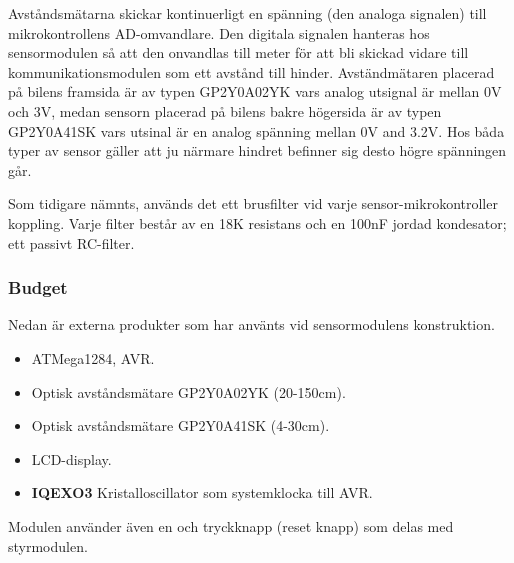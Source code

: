\documentclass[tekniskrapport/tech.tex]{subfiles}
\begin{document}
Avståndsmätarna skickar kontinuerligt en spänning (den analoga signalen) till mikrokontrollens AD-omvandlare. Den digitala signalen hanteras hos sensormodulen så att den onvandlas till meter för att bli skickad vidare till kommunikationsmodulen som ett avstånd till hinder. Avständmätaren placerad på bilens framsida är av typen GP2Y0A02YK vars analog utsignal är mellan 0V och 3V, medan sensorn placerad på bilens bakre högersida är av typen GP2Y0A41SK vars utsinal är en analog spänning mellan 0V and 3.2V. Hos båda typer av sensor gäller att ju närmare hindret befinner sig desto högre spänningen går. 

Som tidigare nämnts, används det ett brusfilter vid varje sensor-mikrokontroller koppling. Varje filter består av en 18K resistans och en 100nF jordad kondesator; ett passivt RC-filter.

\subsubsection{Budget}
Nedan är externa produkter som har använts vid sensormodulens konstruktion.
\begin{itemize}
	\item \textbf{\modMicrocontroller} ATMega1284, AVR. 
    \item \textbf{\modDistf} Optisk avståndsmätare GP2Y0A02YK (20-150cm).
    \item \textbf{\modDists} Optisk avståndsmätare GP2Y0A41SK (4-30cm).
    \item \textbf{\modLcd} LCD-display.
    \item \textbf{IQEXO3} Kristalloscillator som systemklocka till AVR.
\end{itemize}
Modulen använder även en {\modJtag} och tryckknapp (reset knapp) som delas med styrmodulen.
\end{document}
